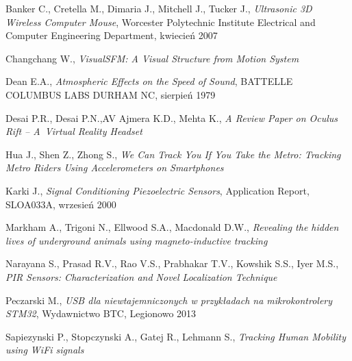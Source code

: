 \begin{thebibliography}{99}


   Banker C., Cretella M., Dimaria J., Mitchell J., Tucker J., 
  \textit{Ultrasonic 3D Wireless Computer Mouse}, 
  Worcester Polytechnic Institute Electrical and Computer Engineering Department, kwiecień 2007 

     Changchang W.,
  \textit{VisualSFM: A Visual Structure from Motion System}

      Dean E.A., \textit{Atmospheric Effects on the Speed of Sound}, 
  BATTELLE COLUMBUS LABS DURHAM NC, sierpień 1979

   Desai P.R., Desai P.N.,AV Ajmera K.D., Mehta K.,
  \textit{A Review Paper on Oculus Rift -- A~Virtual Reality Headset}

     Hua J., Shen Z., Zhong S., 
  \textit{We Can Track You If You Take the Metro: Tracking Metro Riders Using Accelerometers on Smartphones}

  
   Karki J., \textit{Signal Conditioning Piezoelectric Sensors}, 
  Application Report, SLOA033A, wrzesień 2000

     Markham A., Trigoni N., Ellwood S.A., Macdonald D.W.,
  \textit{Revealing the hidden lives of underground animals using magneto-inductive tracking}

     Narayana S., Prasad R.V., Rao V.S., Prabhakar  T.V., Kowshik S.S., Iyer M.S.,
  \textit{PIR Sensors: Characterization and Novel Localization Technique}

     Peczarski M., 
  \textit{USB dla niewtajemniczonych w przykładach na mikrokontrolery STM32}, Wydawnictwo BTC, Legionowo 2013


     Sapiezynski P., Stopczynski A., Gatej R., Lehmann S.,
  \textit{Tracking Human Mobility using WiFi signals} 


\end{thebibliography}
